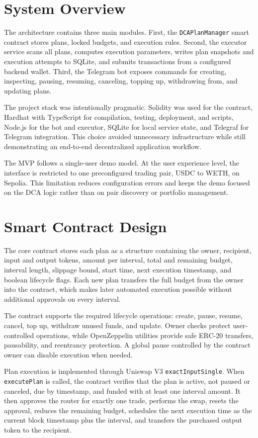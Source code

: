 \documentclass[conference]{IEEEtran}
\begin{document}
\section{System Overview}
The architecture contains three main modules. First, the \texttt{DCAPlanManager} smart contract stores plans, locked budgets, and execution rules. Second, the executor service scans all plans, computes execution parameters, writes plan snapshots and execution attempts to SQLite, and submits transactions from a configured backend wallet. Third, the Telegram bot exposes commands for creating, inspecting, pausing, resuming, canceling, topping up, withdrawing from, and updating plans.

The project stack was intentionally pragmatic. Solidity was used for the contract, Hardhat with TypeScript for compilation, testing, deployment, and scripts, Node.js for the bot and executor, SQLite for local service state, and Telegraf for Telegram integration. This choice avoided unnecessary infrastructure while still demonstrating an end-to-end decentralized application workflow.

The MVP follows a single-user demo model. At the user experience level, the interface is restricted to one preconfigured trading pair, USDC to WETH, on Sepolia. This limitation reduces configuration errors and keeps the demo focused on the DCA logic rather than on pair discovery or portfolio management.

\section{Smart Contract Design}
The core contract stores each plan as a structure containing the owner, recipient, input and output tokens, amount per interval, total and remaining budget, interval length, slippage bound, start time, next execution timestamp, and boolean lifecycle flags. Each new plan transfers the full budget from the owner into the contract, which makes later automated execution possible without additional approvals on every interval.

The contract supports the required lifecycle operations: create, pause, resume, cancel, top up, withdraw unused funds, and update. Owner checks protect user-controlled operations, while OpenZeppelin utilities provide safe ERC-20 transfers, pausability, and reentrancy protection. A global pause controlled by the contract owner can disable execution when needed.

Plan execution is implemented through Uniswap V3 \texttt{exactInputSingle}. When \texttt{executePlan} is called, the contract verifies that the plan is active, not paused or canceled, due by timestamp, and funded with at least one interval amount. It then approves the router for exactly one trade, performs the swap, resets the approval, reduces the remaining budget, schedules the next execution time as the current block timestamp plus the interval, and transfers the purchased output token to the recipient.
\end{document}
